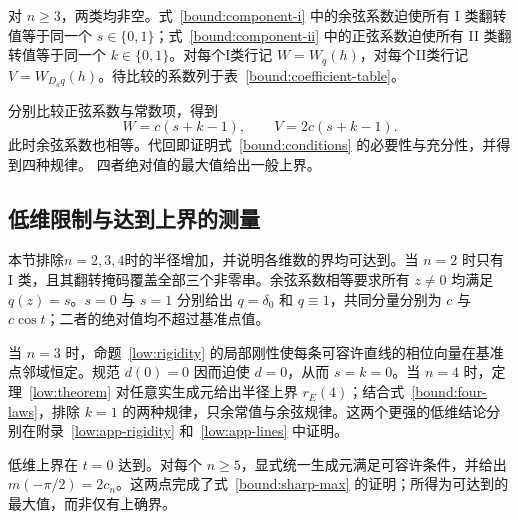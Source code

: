 对 $n\ge3$，两类均非空。式~\eqref{bound:component-i} 中的余弦系数迫使所有 I 类翻转值等于同一个 $s\in\{0,1\}$；式~\eqref{bound:component-ii} 中的正弦系数迫使所有 II 类翻转值等于同一个 $k\in\{0,1\}$。对每个I类行记 $W=W_q(h)$，对每个II类行记 $V=W_{D_aq}(h)$。待比较的系数列于表~\ref{bound:coefficient-table}。

分别比较正弦系数与常数项，得到
\begin{equation}
 W=c(s+k-1),\qquad V=2c(s+k-1).
 \label{bound:coefficient-equalities}
\end{equation}
此时余弦系数也相等。代回即证明式~\eqref{bound:conditions} 的必要性与充分性，并得到四种规律。
四者绝对值的最大值给出一般上界。

\subsection{低维限制与达到上界的测量}
\label{bound:app-sharpness}
本节排除$n=2,3,4$时的半径增加，并说明各维数的界均可达到。当 $n=2$ 时只有 I 类，且其翻转掩码覆盖全部三个非零串。余弦系数相等要求所有 $z\ne0$ 均满足 $q(z)=s$。$s=0$ 与 $s=1$ 分别给出 $q=\delta_0$ 和 $q\equiv1$，共同分量分别为 $c$ 与 $c\cos t$；二者的绝对值均不超过基准点值。

当 $n=3$ 时，命题~\ref{low:rigidity} 的局部刚性使每条可容许直线的相位向量在基准点邻域恒定。规范 $d(0)=0$ 因而迫使 $d=0$，从而 $s=k=0$。当 $n=4$ 时，定理~\ref{low:theorem} 对任意实生成元给出半径上界 $r_E(4)$；结合式~\eqref{bound:four-laws}，排除 $k=1$ 的两种规律，只余常值与余弦规律。这两个更强的低维结论分别在附录~\ref{low:app-rigidity} 和~\ref{low:app-lines} 中证明。

低维上界在 $t=0$ 达到。对每个 $n\ge5$，显式统一生成元满足可容许条件，并给出 $m(-\pi/2)=2c_n$。这两点完成了式~\eqref{bound:sharp-max} 的证明；所得为可达到的最大值，而非仅有上确界。
